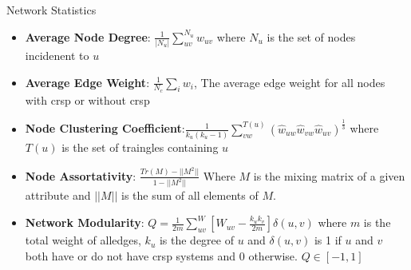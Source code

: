 \documentclass[dvipsnames]{beamer}
\begin{document}
\begin{frame}[fragile]{Network Statistics}
    \begin{itemize}
        \item<2-> \textbf{Average Node Degree}: $\frac{1}{|N_u|}\sum_{uv}^{N_u} w_{uv}$ where $N_u$ is the set of nodes incidenent to $u$
        \item<3-> \textbf{Average Edge Weight}: $\frac{1}{N_c}\sum_i w_i$, The average edge weight for all nodes with \ac{crsp} or without \ac{crsp}
        \item<4-> \textbf{Node Clustering Coefficient}:$\frac{1}{k_u(k_u-1)} \sum_{vw}^{T(u)} (\hat{w}_{uw} \hat{w}_{vw} \hat{w}_{uv})^{\frac{1}{3}}$ where $T(u)$ is the set of traingles containing $u$ \autocite{clustering}
        \item<5-> \textbf{Node Assortativity}: $\frac{Tr(M)-||M^2||}{1-||M^2||}$ Where $M$ is the mixing matrix of a given attribute and $||M||$ is the sum of all elements of $M$.\autocite{newmanmix}
        \item<6-> \textbf{Network Modularity}: $Q=\frac{1}{2m}\sum_{uv}^W [W_{uv} - \frac{k_u k_v}{2m}]\delta(u,v)$ where $m$ is the total weight of alledges, $k_u$ is the degree of $u$ and $\delta(u,v)$ is 1 if $u$ and $v$ both have or do not have \ac{crsp} systems and 0 otherwise. $Q \in [-1,1]$ \autocite{modularity}
    \end{itemize}
\end{frame}
\end{document}
